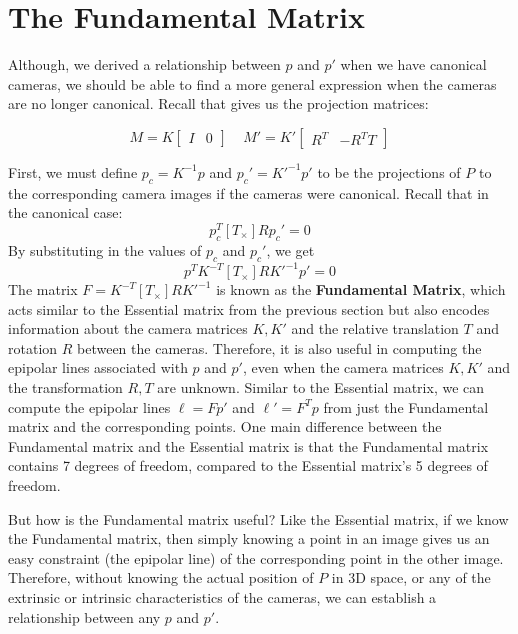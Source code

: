 \documentclass[a4paper, 12pt]{article}
\renewcommand\emph{\textbf}
\begin{document}

\section{The Fundamental Matrix}
Although, we derived a relationship between $p$ and $p'$ when we have canonical cameras, we should be able to find a more general expression when the cameras are no longer canonical. Recall that gives us the projection matrices:

\begin{equation}
    M = K\begin{bmatrix} I & 0\end{bmatrix} \ \ \ \ \ M' = K'\begin{bmatrix}R^T & -R^TT\end{bmatrix}
    \label{eq:projection_matrices2}
\end{equation}

First, we must define $p_c = K^{-1}p$ and $p_c' = K'^{-1}p'$ to be the projections of $P$ to the corresponding camera images if the cameras were canonical. Recall that in the canonical case:
\begin{equation}
    p^T_c [T_\times]Rp_c' = 0
    \label{eq:canonical_constraint}
\end{equation}
By substituting in the values of $p_c$ and $p_c'$, we get
\begin{equation}
    p^TK^{-T} [T_\times]RK'^{-1}p' = 0
    \label{eq:canonical_constraint_substitute}
\end{equation}
The matrix $F = K^{-T} [T_\times]RK'^{-1}$ is known as the \emph{Fundamental Matrix}, which acts similar to the Essential matrix from the previous section but also encodes information about the camera matrices $K, K'$ and the relative translation $T$ and rotation $R$ between the cameras. Therefore, it is also useful in computing the epipolar lines associated with $p$ and $p'$, even when the camera matrices $K, K'$ and the transformation $R,T$ are unknown. Similar to the Essential matrix, we can compute the epipolar lines $\ell = Fp'$ and $\ell' = F^T p$ from just the Fundamental matrix and the corresponding points. One main difference between the Fundamental matrix and the Essential matrix is that the Fundamental matrix contains 7 degrees of freedom, compared to the Essential matrix's 5 degrees of freedom.

But how is the Fundamental matrix useful? Like the Essential matrix, if we know the Fundamental matrix, then simply knowing a point in an image gives us an easy constraint (the epipolar line) of the corresponding point in the other image. Therefore, without knowing the actual position of $P$ in 3D space, or any of the extrinsic or intrinsic characteristics of the cameras, we can establish a relationship between any $p$ and $p'$. 
\end{document}
